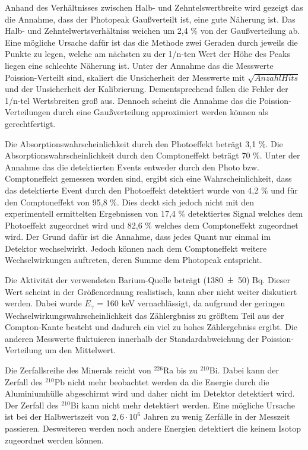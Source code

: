 Anhand des Verhältnisses zwischen Halb- und Zehntelswertbreite wird gezeigt das die Annahme, dass der Photopeak Gaußverteilt ist, eine gute Näherung ist. Das Halb- und Zehntelwertsverhältniss weichen um 2,4 \% von der Gaußverteilung ab. Eine mögliche Ursache dafür ist das die Methode zwei Geraden durch jeweils die Punkte zu legen, welche am nächsten zu der 1/n-ten Wert der Höhe des Peaks liegen eine schlechte Näherung ist. Unter der Annahme das die Messwerte Poission-Verteilt sind, skaliert die Unsicherheit der Messwerte mit $\sqrt{Anzahl Hits}$ und der Unsicherheit der Kalibrierung. Dementsprechend fallen die Fehler der 1/n-tel Wertsbreiten groß aus. Dennoch scheint die Annahme das die Poission-Verteilungen durch eine Gaußverteilung approximiert werden können als gerechtfertigt.

Die Absorptionswahrscheinlichkeit durch den Photoeffekt beträgt 3,1 \%. Die Absorptionswahrscheinlichkeit durch den Comptoneffekt beträgt 70 \%. Unter der Annahme das die detektierten Events entweder durch den Photo bzw. Comptoneffekt gemessen worden sind, ergibt sich eine Wahrscheinlichkeit, dass das detektierte Event durch den Photoeffekt detektiert wurde von 4,2 \% und für den Comptoneffekt von 95,8 \%. Dies deckt sich jedoch nicht mit den experimentell ermittelten Ergebnissen von 17,4 \% detektiertes Signal welches dem Photoeffekt zugeordnet wird und 82,6 \% welches dem Comptoneffekt zugeordnet wird. Der Grund dafür ist die Annahme, dass jedes Quant nur einmal im Detektor wechselwirkt. Jedoch können nach dem Comptoneffekt weitere Wechselwirkungen auftreten, deren Summe dem Photopeak entspricht.

Die Aktivität der verwendeten Barium-Quelle beträgt (\num{1380 +- 50}) Bq. Dieser Wert scheint in der Größenordnung realistisch, kann aber nicht weiter diskutiert werden. Dabei wurde $E_\gamma$ = 160 keV vernachlässigt, da aufgrund der geringen Wechselwirkungswahrscheinlichkeit das Zählergbniss zu größtem Teil aus der Compton-Kante besteht und dadurch ein viel zu hohes Zählergebniss ergibt. Die anderen Messwerte fluktuieren innerhalb der Standardabweichung der Poission-Verteilung um den Mittelwert.

Die Zerfallsreihe des Minerals reicht von $^{226}$Ra bis zu $^{210}$Bi. Dabei kann der Zerfall des $^{210}$Pb nicht mehr beobachtet werden da die Energie durch die Aluminiumhülle abgeschirmt wird und daher nicht im Detektor detektiert wird. Der Zerfall des $^{210}$Bi kann nicht mehr detektiert werden. Eine mögliche Ursache ist bei der Halbwertszeit von $2,6 \cdot 10^6$ Jahren zu wenig Zerfälle in der Messzeit passieren. Desweiteren werden noch andere Energien detektiert die keinem Isotop zugeordnet werden können.

